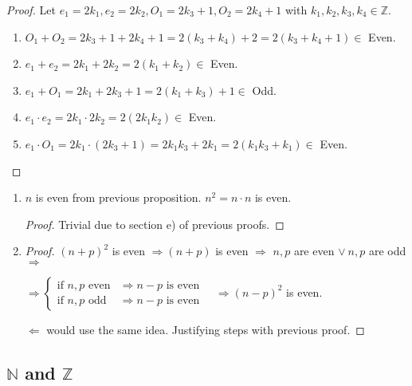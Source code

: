 \documentclass[12pt, a4paper]{book}
\begin{document}
\begin{proof}
  Let $e_1 = 2 k_1, e_2 = 2 k_2, O_1 = 2 k_3+1, O_2 = 2 k_4+1$ with $k_1, k_2, k_3, k_4 \in\mathbb{Z}$.
  \begin{enumerate}[label=\emph{\alph*})]
    \item $O_1 + O_2 = 2 k_3 +1 +2 k_4 +1 = 2(k_3+k_4) + 2 = 2(k_3+k_4+1) \in$ Even.
    \item $e_1 + e_2 = 2 k_1 + 2 k_2 = 2(k_1+k_2) \in$ Even.
    \item $e_1 + O_1 = 2 k_1 +2 k_3 +1 = 2 (k_1+k_3) +1 \in$ Odd.
    \item $e_1 \cdot e_2 = 2 k_1 \cdot 2 k_2 = 2(2k_1 k_2) \in$ Even.
    \item $e_1 \cdot O_1 = 2 k_1 \cdot (2 k_3 +1) = 2 k_1 k_3 + 2 k_1 = 2 (k_1 k_3 + k_1) \in$ Even.
  \end{enumerate}
\end{proof}

\begin{proposition}
  \begin{enumerate}[label=\emph{\alph*})]
    \item $n$ is even from previous proposition. $n^2 = n \cdot n$ is even.
    \begin{proof}
      Trivial due to section e) of previous proofs.
    \end{proof}
    \item \begin{proof}
      ${(n+p)}^2$ is even $\Rightarrow (n+p)$ is even $\Rightarrow$ $n,p$ are even $\vee\ n,p$ are odd $\Rightarrow$  
    
      $\Rightarrow \displaystyle
      \begin{cases} 
        \text{if } n,p \text{ even} &\Rightarrow n-p \text{ is even} \\
        \text{if } n,p \text{ odd} &\Rightarrow n-p \text{ is even}
      \end{cases}\quad \Rightarrow {(n-p)}^2$ is even.

      $\Leftarrow$ would use the same idea. Justifying steps with previous proof.
    \end{proof}
  \end{enumerate}
\end{proposition}

\subsection{$\mathbb{N}$ and $\mathbb{Z}$}
\end{document}
